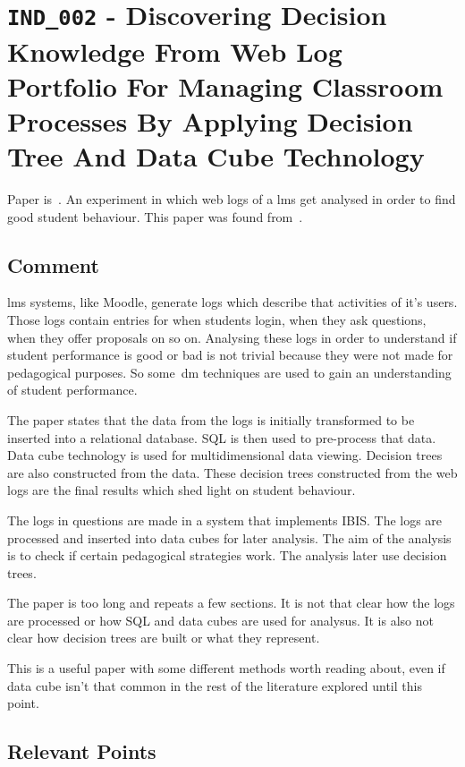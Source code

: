 \section{\texttt{IND\_002} - Discovering Decision Knowledge From Web Log
Portfolio For Managing Classroom Processes By Applying Decision Tree And Data
Cube Technology}

Paper is~\cite{ind_002}. An experiment in which web logs of a \gls{lms} get
analysed in order to find good student behaviour. This paper was found
from~\cite{ind_001}.

\subsection{Comment}

\gls{lms} systems, like Moodle, generate logs which describe that activities of
it's users. Those logs contain entries for when students login, when they ask
questions, when they offer proposals on so on. Analysing these logs in order to
understand if student performance is good or bad is not trivial because they
were not made for pedagogical purposes. So some~\gls{dm} techniques are used to
gain an understanding of student performance.

The paper states that the data from the logs is initially transformed to be
inserted into a relational database. SQL is then used to pre-process that data.
Data cube technology is used for multidimensional data viewing. Decision trees
are also constructed from the data. These decision trees constructed from the
web logs are the final results which shed light on student behaviour.

The logs in questions are made in a system that implements IBIS. The logs are
processed and inserted into data cubes for later analysis. The aim of the
analysis is to check if certain pedagogical strategies work. The analysis later
use decision trees.

The paper is too long and repeats a few sections. It is not that clear how the
logs are processed or how SQL and data cubes are used for analysus. It is also
not clear how decision trees are built or what they represent.

This is a useful paper with some different methods worth reading about, even if
data cube isn't that common in the rest of the literature explored until this
point.

\subsection{Relevant Points}

